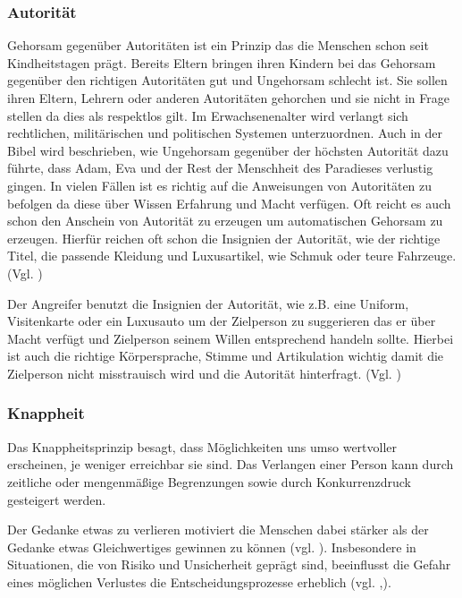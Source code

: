 \subsubsection{Autorität}

Gehorsam gegenüber Autoritäten ist ein Prinzip das die Menschen schon seit Kindheitstagen prägt. Bereits Eltern bringen ihren Kindern bei das Gehorsam gegenüber den richtigen Autoritäten gut und Ungehorsam schlecht ist. Sie sollen ihren Eltern, Lehrern oder anderen Autoritäten gehorchen und sie nicht in Frage stellen da dies als respektlos gilt. Im Erwachsenenalter wird verlangt sich rechtlichen, militärischen und politischen Systemen unterzuordnen. Auch in der Bibel wird beschrieben, \glqq wie Ungehorsam gegenüber der höchsten Autorität dazu führte, dass Adam, Eva und der Rest der Menschheit des Paradieses verlustig gingen.\grqq{} \cite{PsychDesÜberzeugensBibel} 
In vielen Fällen ist es richtig auf die Anweisungen von Autoritäten zu befolgen da diese über Wissen Erfahrung und Macht verfügen. 
Oft reicht es auch schon den Anschein von Autorität zu erzeugen um automatischen Gehorsam zu erzeugen. Hierfür reichen oft schon die Insignien der Autorität, wie der richtige Titel, die passende Kleidung und Luxusartikel, wie Schmuk oder teure Fahrzeuge. (Vgl. \cite{PsychDesÜberzeugensAuto}) 

Der Angreifer benutzt die Insignien der Autorität, wie z.B. eine Uniform, Visitenkarte oder ein Luxusauto um der Zielperson zu suggerieren das er über Macht verfügt und Zielperson seinem Willen entsprechend handeln sollte. Hierbei ist auch die richtige Körpersprache, Stimme und Artikulation wichtig damit die Zielperson nicht misstrauisch wird und die Autorität hinterfragt. (Vgl. \cite{Auto})


\subsubsection{Knappheit}

Das Knappheitsprinzip besagt, \glqq dass Möglichkeiten uns umso wertvoller erscheinen, je weniger erreichbar sie sind\grqq{}\cite{PsychDesÜberzeugensKnapp1}. Das Verlangen einer Person kann durch zeitliche oder mengenmäßige Begrenzungen sowie durch Konkurrenzdruck gesteigert werden. \cite{PsychDesÜberzeugensKnapp}

Der Gedanke etwas zu verlieren motiviert die Menschen dabei stärker als der Gedanke etwas Gleichwertiges gewinnen zu können (vgl. \cite{Knapp}). Insbesondere in Situationen, die von Risiko und Unsicherheit geprägt sind, beeinflusst die Gefahr eines möglichen Verlustes die Entscheidungsprozesse erheblich (vgl. \cite{Knapp1},\cite{Knapp2}).

